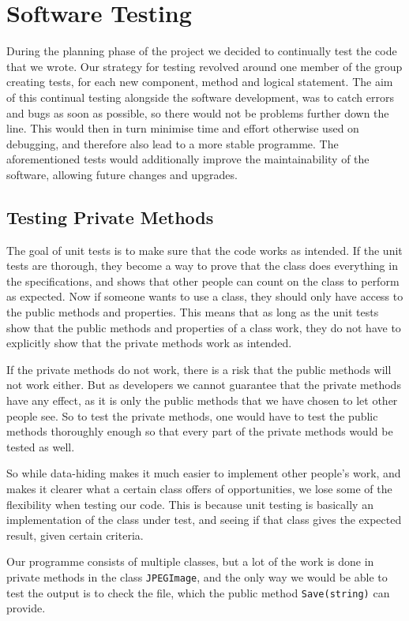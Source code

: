 \section{Software Testing}
During the planning phase of the project we decided to continually test the code that we wrote.
Our strategy for testing revolved around one member of the group creating tests, for each new component, method and logical statement.
The aim of this continual testing alongside the software development, was to catch errors and bugs as soon as possible, so there would not be problems further down the line.
This would then in turn minimise time and effort otherwise used on debugging, and therefore also lead to a more stable programme.
The aforementioned tests would additionally improve the maintainability of the software, allowing future changes and upgrades.

\subsection{Testing Private Methods}
The goal of unit tests is to make sure that the code works as intended.
If the unit tests are thorough, they become a way to prove that the class does everything in the specifications, and shows that other people can count on the class to perform as expected.
Now if someone wants to use a class, they should only have access to the public methods and properties.
This means that as long as the unit tests show that the public methods and properties of a class work, they do not have to explicitly show that the private methods work as intended.

If the private methods do not work, there is a risk that the public methods will not work either.
But as developers we cannot guarantee that the private methods have any effect, as it is only the public methods that we have chosen to let other people see. 
So to test the private methods, one would have to test the public methods thoroughly enough so that every part of the private methods would be tested as well. 

So while data-hiding makes it much easier to implement other people's work, and makes it clearer what a certain class offers of opportunities, we lose some of the flexibility when testing our code.
This is because unit testing is basically an implementation of the class under test, and seeing if that class gives the expected result, given certain criteria. 

Our programme consists of multiple classes, but a lot of the work is done in private methods in the class \lstinline|JPEGImage|, and the only way we would be able to test the output is to check the file, which the public method \lstinline|Save(string)| can provide.

